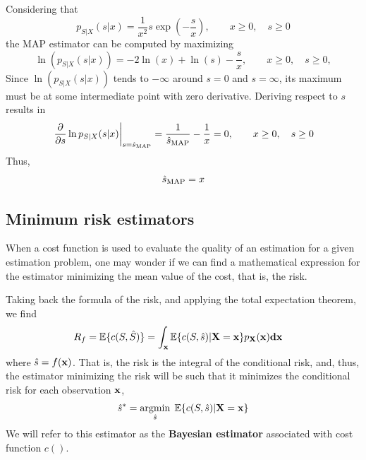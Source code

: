 \begin{example}
Considering that  
\begin{equation}
p_{S|X}(s|x) = \frac{1}{x^2} s \exp\left(-\frac{s}{x}\right), \qquad  x\ge 0,\quad s \ge 0
\end{equation}
the MAP estimator can be computed by maximizing
\begin{equation}
\ln(p_{S|X}(s|x)) = -2\ln(x) + \ln(s)-\frac{s}{x}, \qquad  x\ge 0,\quad s \ge 0,
\end{equation}
Since $\ln(p_{S|X}(s|x))$ tends to $-\infty$ around $s=0 $ and $s=\infty$, its maximum must be at some intermediate point with zero derivative. Deriving respect to $s$ results in
\begin{equation}
\left.\frac{\partial}{\partial s} \ln p_{S|X}(s|x)\right|_{s=\hat{s}_\text{MAP}} 
	= \frac{1}{\hat{s}_\text{MAP}} - \frac{1}{x} 
	= 0, \qquad  x\ge 0, \quad s \ge 0
\end{equation}
Thus,
\begin{equation}
\hat{s}_\text{MAP} = x
\end{equation}
\end{example}   %

\subsection{Minimum risk estimators}

When a cost function is used to evaluate the quality of an estimation for a given estimation problem, one may wonder if we can find a mathematical expression for the estimator minimizing the mean value of the cost, that is, the risk.

{Taking back the formula of the risk, and applying the total expectation theorem, we find
\begin{align}
\label{ec:coste_medio}
R_f = \mathbb{E}\{c(S,\hat S)\} 
  & = \int_{\bf x} \mathbb{E}\{c(S,\hat s)|{\bf X} = {\bf x} \} 
               p_{\bf X}(\bf x) d{\bf x}
\end{align}
where $\hat s= f({\bf x})$. That is, the risk is the integral of the conditional risk, and, thus, the estimator minimizing the risk will be such that it minimizes the conditional risk for each observation ${\bf x}$,}
\begin{equation}
\label{ec:est_bayesiano}
{\hat s}^* = \operatorname*{argmin}_{\hat s}\;\mathbb{E}\{c(S,\hat s)|{\bf X} = {\bf x} \}
\end{equation}
We will refer to this estimator as the \textbf{Bayesian estimator} associated with cost function $c()$. 


